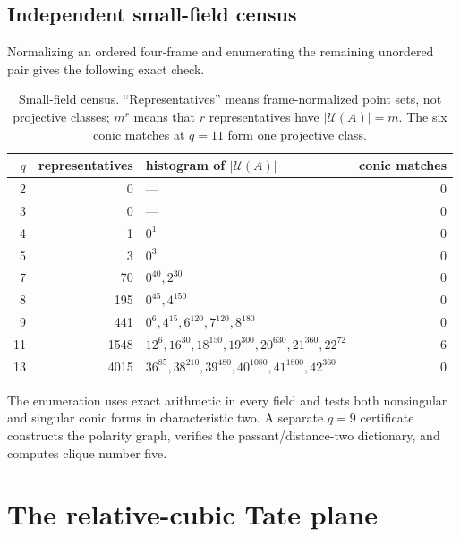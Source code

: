 \documentclass[11pt]{article}
\theoremstyle{definition}
\theoremstyle{remark}
\newcommand{\cU}{\mathcal{U}}
\begin{document}
\subsection{Independent small-field census}

Normalizing an ordered four-frame and enumerating the remaining unordered
pair gives the following exact check.

\begin{table}[H]
\centering
\small
\begin{tabular}{@{}r r l r@{}}
\toprule
$q$ & representatives & histogram of $|\cU(A)|$ & conic matches\\
\midrule
2  & 0    & --- & 0\\
3  & 0    & --- & 0\\
4  & 1    & $0^1$ & 0\\
5  & 3    & $0^3$ & 0\\
7  & 70   & $0^{40},2^{30}$ & 0\\
8  & 195  & $0^{45},4^{150}$ & 0\\
9  & 441  & $0^6,4^{15},6^{120},7^{120},8^{180}$ & 0\\
11 & 1548 & $12^6,16^{30},18^{150},19^{300},20^{630},21^{360},22^{72}$ & 6\\
13 & 4015 & $36^{85},38^{210},39^{480},40^{1080},41^{1800},42^{360}$ & 0\\
\bottomrule
\end{tabular}
\caption{Small-field census. ``Representatives'' means frame-normalized
point sets, not projective classes; $m^r$ means that $r$ representatives
have $|\cU(A)|=m$. The six conic matches at $q=11$ form one projective
class.}
\label{tab:small-field-census}
\end{table}

The enumeration uses exact arithmetic in every field and tests both nonsingular
and singular conic forms in characteristic two. A separate $q=9$
certificate constructs the polarity graph, verifies the passant/distance-two
dictionary, and computes clique number five.

\appendix
\section{The relative-cubic Tate plane}
\label{app:tate-plane}
\end{document}
